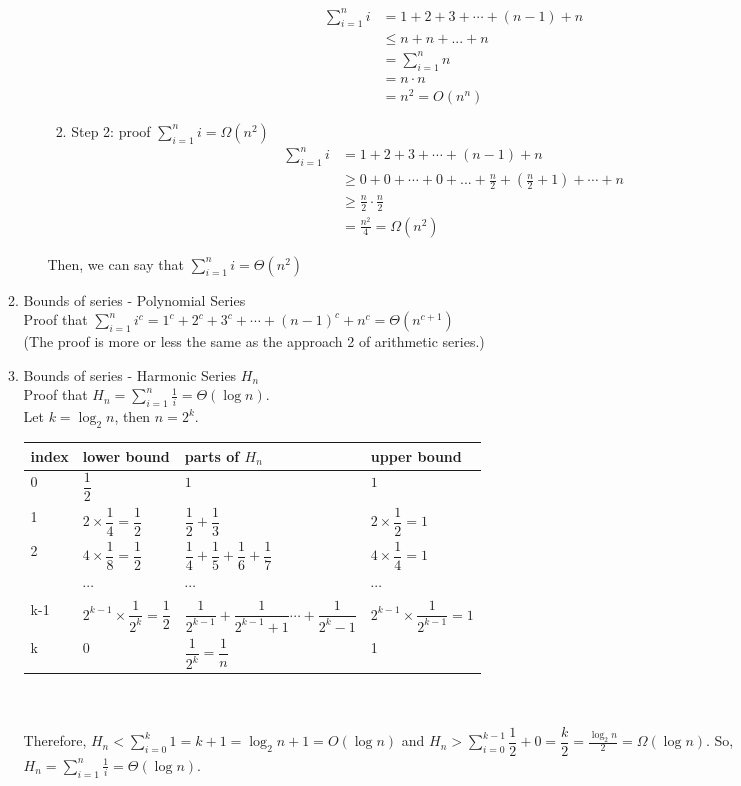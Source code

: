 \documentclass[11pt]{article}
\begin{document}
\begin{enumerate}
\begin{enumerate}
\begin{enumerate}
\begin{enumerate}
\begin{align*}
\sum_{i=1}^{n} i &= 1 +2 +3 + \cdots + (n-1) + n\\
& \leq n + n + ... + n\\
& = \sum_{i=1}^{n} n\\
& = n \cdot n \\
& = n^2 =O(n^{n})
\end{align*}
\item Step 2: proof $\sum_{i=1}^{n} i = \Omega(n^2)$
\begin{align*}
\sum_{i=1}^{n} i &= 1 +2 +3 + \cdots + (n-1) + n\\
& \geq 0+ 0 + \cdots + 0 +...+ \frac{n}{2} + (\frac{n}{2} +1) + \cdots +n \\
& \geq \frac{n}{2} \cdot \frac{n}{2} \\
& = \frac{n^2}{4} = \Omega(n^2)
\end{align*}
\end{enumerate}
Then, we can say that $\sum_{i=1}^{n} i = \Theta (n^2)$
\end{enumerate}
\item Bounds of series - Polynomial Series\\
Proof that $\sum_{i=1}^{n} i^{c} = 1^c +2^c +3^c + \cdots + (n-1)^c + n^c = \Theta (n^{c+1})$\\
(The proof is more or less the same as the approach 2 of arithmetic series.)
\item Bounds of series - Harmonic Series $H_n$\\
Proof that $H_{n} = \sum_{i=1}^{n} \frac{1}{i} = \Theta(\log n)$.\\
Let $k = \log_2 n$, then $n = 2^k$. \\
\begin{tabular}{|l|l|l|l|}
\hline
index&lower bound& parts of $H_n$& upper bound\\
\hline
0&$\dfrac{1}{2}$& $1$& $1$\\
\hline
1&$2 \times \dfrac{1}{4} = \dfrac{1}{2}$ &$\dfrac{1}{2}+ \dfrac{1}{3}$& $2 \times \dfrac{1}{2} = 1$\\
\hline
2&$4 \times \dfrac{1}{8} = \dfrac{1}{2}$ &$\dfrac{1}{4}+ \dfrac{1}{5}+ \dfrac{1}{6}+ \dfrac{1}{7}$& $4 \times \dfrac{1}{4} = 1$\\
\hline
&$\cdots$ & $\cdots$ & $\cdots$\\
\hline
k-1&$2^{k-1} \times \dfrac{1}{2^k} = \dfrac{1}{2}$ &$\dfrac{1}{2^{k-1}}+\dfrac{1}{2^{k-1}+1} \cdots +\dfrac{1}{2^{k} -1}$& $2^{k-1} \times \dfrac{1}{2^{k-1}} = 1$\\
\hline
k&$0$& $\dfrac{1}{2^k} = \dfrac{1}{n}$& 1\\
\hline
\end{tabular}\\\\
Therefore, $H_n < \sum_{i=0}^{k} 1 = k +1 = \log_2 n +1 = O(\log n)$ and $H_n > \sum_{i=0}^{k-1} \dfrac{1}{2} +0 = \dfrac{k}{2} = \frac{\log_2 n}{2} = \Omega (\log n)$. So, $H_{n} = \sum_{i=1}^{n} \frac{1}{i} = \Theta(\log n)$.
\end{enumerate}
\end{enumerate}
\end{document}
